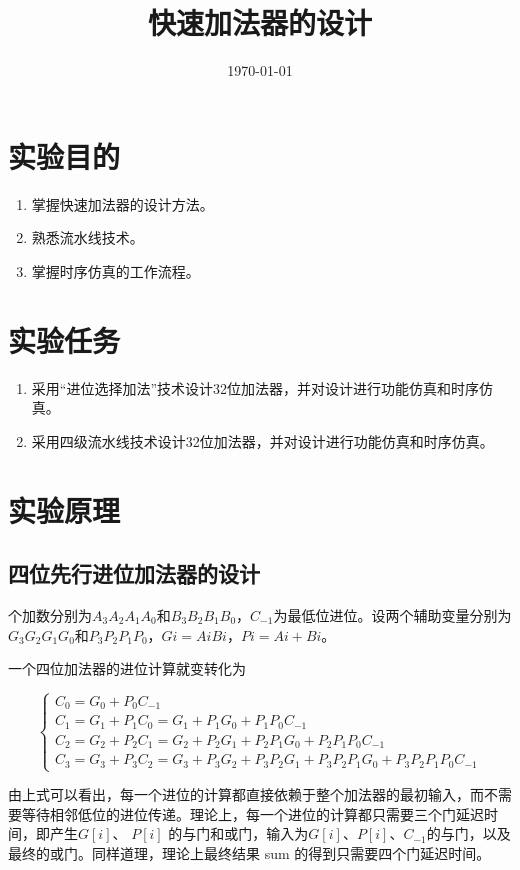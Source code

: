 \documentclass{../source/Experiment}
\title{快速加法器的设计}
\date{\today}
\begin{document}
\makecover
\makeheader


    \section{实验目的}
        \begin{enumerate}
            \item 掌握快速加法器的设计方法。
            \item 熟悉流水线技术。
            \item 掌握时序仿真的工作流程。
        \end{enumerate}
    \section{实验任务}
        \begin{enumerate}
            \item 采用“进位选择加法”技术设计32位加法器，并对设计进行功能仿真和时序仿真。
            \item 采用四级流水线技术设计32位加法器，并对设计进行功能仿真和时序仿真。
        \end{enumerate}
    \section{实验原理}
        \subsection{四位先行进位加法器的设计}
        个加数分别为$A_3 A_2 A_1 A_0$和$B_3 B_2B_1B_0$，$C_{-1}$为最低位进位。设两个辅助变量分别为$G_3G_2G_1G_0$和$P_3P_2P_1P_0$，$Gi= Ai  Bi$，$Pi=Ai+Bi$。

        一个四位加法器的进位计算就变转化为

        $$
        \left\{\begin{array}{l}
        C_{0}=G_{0}+P_{0} C_{-1} \\
        C_{1}=G_{1}+P_{1} C_{0}=G_{1}+P_{1} G_{0}+P_{1} P_{0} C_{-1} \\
        C_{2}=G_{2}+P_{2} C_{1}=G_{2}+P_{2} G_{1}+P_{2} P_{1} G_{0}+P_{2} P_{1} P_{0} C_{-1} \\
        C_{3}=G_{3}+P_{3} C_{2}=G_{3}+P_{3} G_{2}+P_{3} P_{2} G_{1}+P_{3} P_{2} P_{1} G_{0}+P_{3} P_{2} P_{1} P_{0} C_{-1}
        \end{array}\right.
        $$

        由上式可以看出，每一个进位的计算都直接依赖于整个加法器的最初输入，而不需要等待相邻低位的进位传递。理论上，每一个进位的计算都只需要三个门延迟时间，即产生$G [i]$、 $P[ i]$ 的与门和或门，输入为$G [i]$、$P [i]$、$C_{-1}$的与门，以及最终的或门。同样道理，理论上最终结果 sum 的得到只需要四个门延迟时间。
\end{document}
